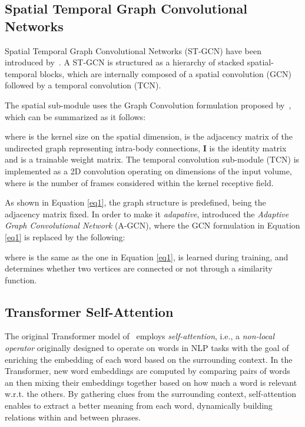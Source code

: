 \documentclass[review]{cvpr}
\begin{document}
\subsection{Spatial Temporal Graph Convolutional Networks}\label{st-gcn}

Spatial Temporal Graph Convolutional Networks (ST-GCN) have been introduced by~\cite{yan2018spatial}. A ST-GCN is structured as a hierarchy of stacked spatial-temporal blocks, which are internally composed of a spatial convolution (GCN) followed by a temporal convolution (TCN). 

The spatial sub-module uses the Graph Convolution formulation proposed by~\cite{Kipf:2016tc}, which can be summarized as it follows:

where  is the kernel size on the spatial dimension,  is the adjacency matrix of the undirected graph representing intra-body connections, \textbf{I} is the identity matrix and  is a trainable weight matrix. The temporal convolution sub-module (TCN) is implemented as a  2D convolution operating on  dimensions of the  input volume, where  is the number of frames considered within the kernel receptive field. 

As shown in Equation \ref{eq1}, the graph structure is predefined, being the adjacency matrix fixed. In order to make it \textit{adapative}, \cite{Shi2018TwoStreamAG} introduced the \textit{Adaptive Graph Convolutional Network} (A-GCN), where the GCN formulation in Equation \ref{eq1} is replaced by the following:

where  is the same as the one in Equation \ref{eq1},  is learned during training, and  determines whether two vertices are connected or not through a similarity function. 

\subsection{Transformer Self-Attention}
The original Transformer model of~\cite{attention} employs \textit{self-attention}, i.e., a \textit{non-local operator} originally designed to operate on words in NLP tasks with the goal of enriching the embedding of each word based on the surrounding context. In the Transformer, new word embeddings are computed by comparing pairs of words an then mixing their embeddings together based on how much a word is relevant w.r.t. the others. By gathering clues from the surrounding context, self-attention enables to extract a better meaning from each word, dynamically building relations within and between phrases.
\end{document}
